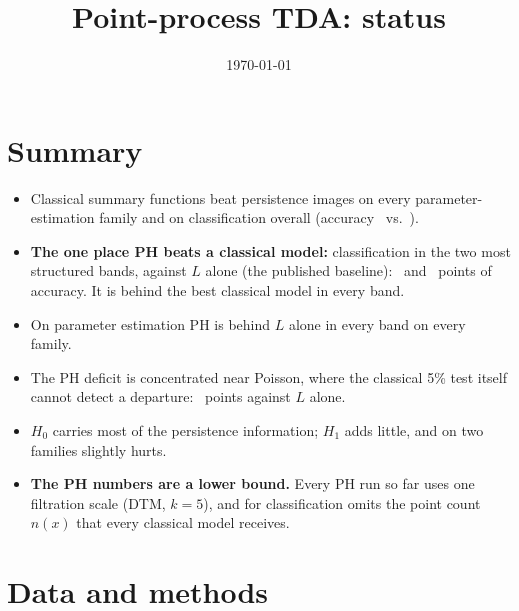\documentclass[10pt,a4paper]{article}
\title{\textbf{Point-process TDA: status}}
\date{\today}
\begin{document}
\maketitle

\section{Summary}

\begin{itemize}
  \item Classical summary functions beat persistence images on every parameter-estimation family and on classification overall (accuracy \cBestAcc\ vs.\ \cPhAcc).
  \item \textbf{The one place PH beats a classical model:} classification in the two most structured bands, against $L$ alone (the published baseline): \cVsLModerate\ and \cVsLStrong\ points of accuracy. It is behind the best classical model in every band.
  \item On parameter estimation PH is behind $L$ alone in every band on every family.
  \item The PH deficit is concentrated near Poisson, where the classical 5\% test itself cannot detect a departure: \cVsLBelow\ points against $L$ alone.
  \item $H_0$ carries most of the persistence information; $H_1$ adds little, and on two families slightly hurts.
  \item \textbf{The PH numbers are a lower bound.} Every PH run so far uses one filtration scale (DTM, $k=5$), and for classification omits the point count $n(x)$ that every classical model receives.
\end{itemize}

\section{Data and methods}
\end{document}
